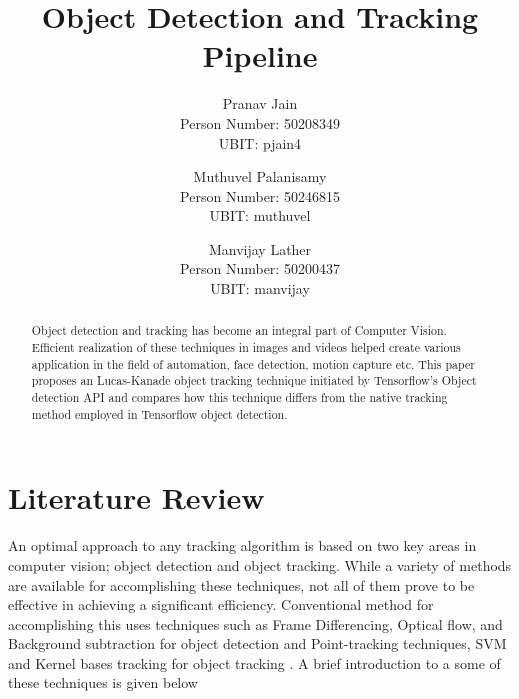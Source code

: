 \documentclass[10pt,twocolumn,letterpaper]{article}
\begin{document}
\title{Object Detection and Tracking Pipeline}

\author{Pranav Jain\\
Person Number: 50208349\\
UBIT: pjain4\\
\and
Muthuvel Palanisamy	\\
Person Number: 50246815\\
UBIT: muthuvel\\
\and
Manvijay Lather	\\
Person Number: 50200437\\
UBIT: manvijay\\
}

\maketitle

\begin{abstract}
   Object detection and tracking has become an integral part of Computer Vision. Efficient realization of these techniques in images and videos helped create various application in the field of automation, face detection, motion capture etc. This paper proposes an Lucas-Kanade object tracking technique initiated by Tensorflow's Object detection API and compares how this technique differs from the native tracking method employed in Tensorflow object detection.
   \end{abstract} 
\section{Literature Review}

An optimal approach to any tracking algorithm is based on two key areas in computer vision; object detection and object tracking. While a variety of methods are available for accomplishing these techniques, not all of them prove to be effective in achieving a significant efficiency. Conventional method for accomplishing this uses techniques such as Frame Differencing, Optical flow, and Background subtraction for object detection and Point-tracking techniques, SVM and Kernel bases tracking for object tracking . A brief introduction to a some of these techniques is given below
\end{document}

